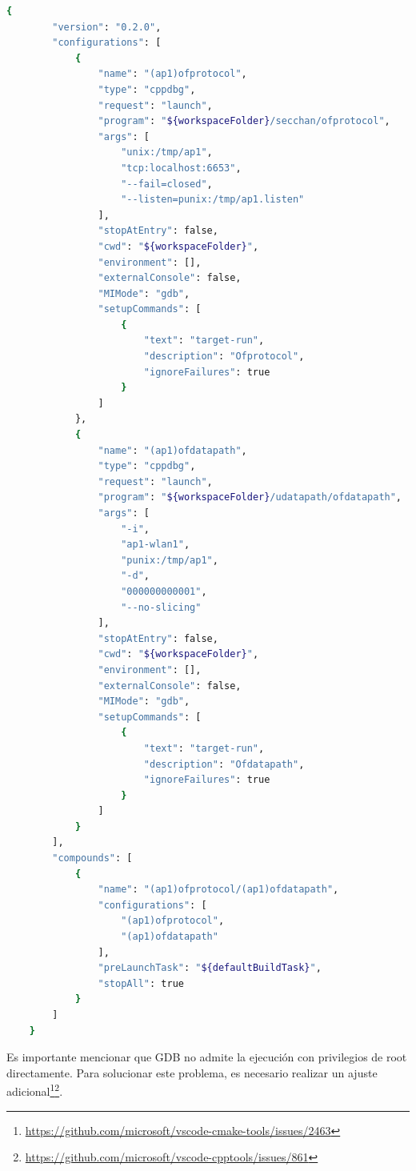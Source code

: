 \begin{lstlisting}[language= bash, style=Consola, caption={JSON de depuración con GDB del BOFUSS},label=code:gdbjson]
    {
        "version": "0.2.0",
        "configurations": [
            {
                "name": "(ap1)ofprotocol",
                "type": "cppdbg",
                "request": "launch",
                "program": "${workspaceFolder}/secchan/ofprotocol",
                "args": [
                    "unix:/tmp/ap1",
                    "tcp:localhost:6653",
                    "--fail=closed",
                    "--listen=punix:/tmp/ap1.listen"
                ],
                "stopAtEntry": false,
                "cwd": "${workspaceFolder}",
                "environment": [],
                "externalConsole": false,
                "MIMode": "gdb",
                "setupCommands": [
                    {
                        "text": "target-run",
                        "description": "Ofprotocol",
                        "ignoreFailures": true
                    }
                ]
            },
            {
                "name": "(ap1)ofdatapath",
                "type": "cppdbg",
                "request": "launch",
                "program": "${workspaceFolder}/udatapath/ofdatapath",
                "args": [
                    "-i",
                    "ap1-wlan1",
                    "punix:/tmp/ap1",
                    "-d",
                    "000000000001",
                    "--no-slicing"
                ],
                "stopAtEntry": false,
                "cwd": "${workspaceFolder}",
                "environment": [],
                "externalConsole": false,
                "MIMode": "gdb",
                "setupCommands": [
                    {
                        "text": "target-run",
                        "description": "Ofdatapath",
                        "ignoreFailures": true
                    }
                ]
            }
        ],
        "compounds": [
            {
                "name": "(ap1)ofprotocol/(ap1)ofdatapath",
                "configurations": [
                    "(ap1)ofprotocol",
                    "(ap1)ofdatapath"
                ],
                "preLaunchTask": "${defaultBuildTask}",
                "stopAll": true
            }
        ]
    }
\end{lstlisting}
\vspace{0.5cm}


Es importante mencionar que GDB no admite la ejecución con privilegios de root directamente. Para solucionar este problema, es necesario realizar un ajuste adicional\footnote{\url{https://github.com/microsoft/vscode-cmake-tools/issues/2463}}\footnote{\url{https://github.com/microsoft/vscode-cpptools/issues/861}}.